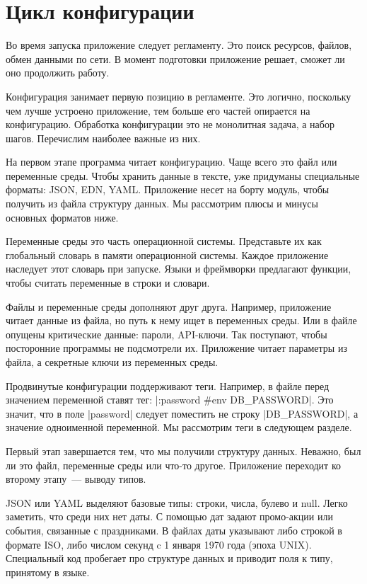 \section{Цикл конфигурации}

Во время запуска приложение следует регламенту. Это поиск ресурсов, файлов,
обмен данными по сети. В момент подготовки приложение решает, сможет ли оно
продолжить работу.

Конфигурация занимает первую позицию в регламенте. Это логично, поскольку чем
лучше устроено приложение, тем больше его частей опирается на
конфигурацию. Обработка конфигурации это не монолитная задача, а набор
шагов. Перечислим наиболее важные из них.

На первом этапе программа читает конфигурацию. Чаще всего это файл или
переменные среды. Чтобы хранить данные в тексте, уже придуманы специальные
форматы: JSON, EDN, YAML. Приложение несет на борту модуль, чтобы получить из
файла структуру данных. Мы рассмотрим плюсы и минусы основных форматов ниже.

Переменные среды это часть операционной системы. Представьте их как глобальный
словарь в памяти операционной системы. Каждое приложение наследует этот словарь
при запуске. Языки и фреймворки предлагают функции, чтобы считать переменные в
строки и словари.

Файлы и переменные среды дополняют друг друга. Например, приложение читает
данные из файла, но путь к нему ищет в переменных среды. Или в файле опущены
критические данные: пароли, API-ключи. Так поступают, чтобы посторонние
программы не подсмотрели их. Приложение читает параметры из файла, а секретные
ключи из переменных среды.

Продвинутые конфигурации поддерживают теги. Например, в файле перед значением
переменной ставят тег: \spverb|:password #env DB_PASSWORD|. Это значит, что в
поле \spverb|password| следует поместить не строку \spverb|DB_PASSWORD|, а
значение одноименной переменной. Мы рассмотрим теги в следующем разделе.

Первый этап завершается тем, что мы получили структуру данных. Неважно, был ли
это файл, переменные среды или что-то другое. Приложение переходит ко второму
этапу~--- выводу типов.

JSON или YAML выделяют базовые типы: строки, числа, булево и null. Легко
заметить, что среди них нет даты. С помощью дат задают промо-акции или события,
связанные с праздниками. В файлах даты указывают либо строкой в формате ISO,
либо числом секунд c 1 января 1970 года (эпоха UNIX). Специальный код пробегает
про структуре данных и приводит поля к типу, принятому в языке.

